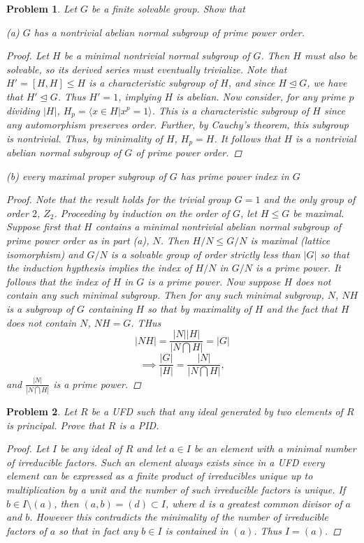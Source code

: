 \documentclass[11pt]{article}
\newcommand{\1}{\textbf{1}}
\newtheorem{prob}{Problem}
\begin{document}
\begin{prob}
Let $G$ be a finite solvable group. Show that

\noindent (a) $G$ has a nontrivial abelian normal subgroup of prime power order.
\begin{proof}
Let $H$ be a minimal nontrivial normal subgroup of $G$. Then $H$ must also be solvable, so its derived series must eventually trivialize. Note that $H' = [H,H]\leq H$ is a characteristic subgroup of $H$, and since $H\trianglelefteq G$, we have that $H'\trianglelefteq G$. Thus $H' = 1$, implying $H$ is abelian. Now consider, for any prime $p$ dividing $|H|$, $H_p = \langle x\in H| x^p = 1\rangle$. This is a characteristic subgroup of $H$ since any automorphism preserves order. Further, by Cauchy's theorem, this subgroup is nontrivial. Thus, by minimality of $H$, $H_p = H$. It follows that $H$ is a nontrivial abelian normal subgroup of $G$ of prime power order. 
\end{proof}

\noindent (b) every maximal proper subgroup of $G$ has prime power index in $G$

\begin{proof}
Note that the result holds for the trivial group $G = 1$ and the only group of order $2$, $Z_2$. Proceeding by induction on the order of $G$, let $H\leq G$ be maximal. Suppose first that $H$ contains a minimal nontrivial abelian normal subgroup of prime power order as in part (a), $N$. Then $H/N\leq G/N$ is maximal (lattice isomorphism) and $G/N$ is a solvable group of order strictly less than $|G|$ so that the induction hypthesis implies the index of $H/N$ in $G/N$ is a prime power. It follows that the index of $H$ in $G$ is a prime power. Now suppose $H$ does not contain any such minimal subgroup. Then for any such minimal subgroup, $N$, $NH$ is a subgroup of $G$ containing $H$ so that by maximality of $H$ and the fact that $H$ does not contain $N$, $NH = G$. THus \[|NH| = \frac{|N||H|}{|N\bigcap H|} = |G| \] \[\implies \frac{|G|}{|H|} = \frac{|N|}{|N\bigcap H|},\] and $\frac{|N|}{|N\bigcap H|}$ is a prime power. 
\end{proof}
\end{prob}

\begin{prob}
Let $R$ be a UFD such that any ideal generated by two elements of $R$ is principal.
Prove that $R$ is a PID.

\begin{proof}
Let $I$ be any ideal of $R$ and let $a\in I$ be an element with a minimal number of irreducible factors. Such an element always exists since in a UFD every element can be expressed as a finite product of irreducibles unique up to multiplication by a unit and the number of such irreducible factors is unique. If $b\in I\setminus (a)$, then $(a,b) = (d)\subset I$, where $d$ is a greatest common divisor of $a$ and $b$. However this contradicts the minimality of the number of irreducible factors of $a$ so that in fact any $b\in I$ is contained in $(a)$. Thus $I = (a)$.  
\end{proof}
\end{prob}
\end{document}
